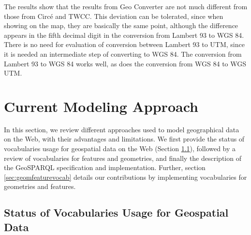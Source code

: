 \begin{figure}[ht!]
\end{figure}

 The results show that the results from Geo Converter are not much different from those from Circ\'e and TWCC. This deviation can be tolerated, since when showing on the map, they are basically the same point, although the difference appears in the fifth decimal digit in the conversion from Lambert 93 to WGS 84.
There is no need for evaluation of conversion between Lambert 93 to UTM, since it is needed an intermediate step of converting to WGS 84. The conversion from Lambert 93 to WGS 84 works well, as does the conversion from WGS 84 to WGS UTM.

\section{Current Modeling Approach}
\label{sec:currentmodel}
In this section, we review different approaches used to model geographical data on the Web, with their advantages and limitations.
We first provide the status of vocabularies usage for geospatial data on the Web (Section \ref{sec:vocgeoreview}), followed by a review of vocabularies for features and geometries, and finally the description of the GeoSPARQL specification and implementation. Further, section \ref{sec:geomfeaturevocab} details our contributions by implementing vocabularies for geometries and features. 
 
\subsection{Status of Vocabularies Usage for Geospatial Data}
\label{sec:vocgeoreview}

